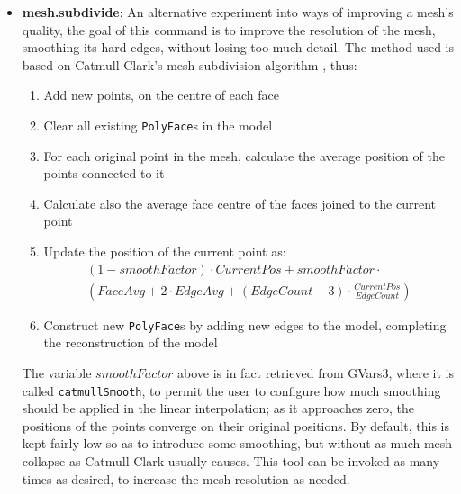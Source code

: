 \documentclass[a4paper,10pt]{article}
\begin{document}
\begin{itemize}
\item{\textbf{mesh.subdivide}: An alternative experiment into ways of improving a mesh's quality, the goal of this command is to improve the resolution of the mesh, smoothing its hard edges, without losing too much detail. The method used is based on Catmull-Clark's mesh subdivision algorithm \cite{catmull}, thus:
\begin{enumerate}
\item{Add new points, on the centre of each face}
\item{Clear all existing \texttt{PolyFace}s in the model}
\item{For each original point in the mesh, calculate the average position of the points connected to it}
\item{Calculate also the average face centre of the faces joined to the current point}
\item{Update the position of the current point as:
\begin{eqnarray*}
 (1 - smoothFactor) \cdot CurrentPos + smoothFactor \cdot \\ \left(FaceAvg + 2 \cdot EdgeAvg + (EdgeCount-3) \cdot \frac{CurrentPos}{EdgeCount}\right)
\end{eqnarray*}
}

\item{Construct new \texttt{PolyFace}s by adding new edges to the model, completing the reconstruction of the model}
\end{enumerate}

The variable $smoothFactor$ above is in fact retrieved from GVars3, where it is called \texttt{catmullSmooth}, to permit the user to configure how much smoothing should be applied in the linear interpolation; as it approaches zero, the positions of the points converge on their original positions. By default, this is kept fairly low so as to introduce some smoothing, but without as much mesh collapse as Catmull-Clark usually causes. This tool can be invoked as many times as desired, to increase the mesh resolution as needed.
}


\end{itemize}
\end{document}
